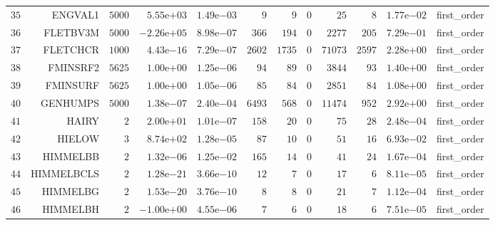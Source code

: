 \begin{longtable}{rrrrrrrrrrrr}
  \(    35\) & ENGVAL1 & \(  5000\) & \( 5.55\)e\(+03\) & \( 1.49\)e\(-03\) & \(     9\) & \(     9\) & \(     0\) & \(    25\) & \(     8\) & \( 1.77\)e\(-02\) & first\_order \\
  \(    36\) & FLETBV3M & \(  5000\) & \(-2.26\)e\(+05\) & \( 8.98\)e\(-07\) & \(   366\) & \(   194\) & \(     0\) & \(  2277\) & \(   205\) & \( 7.29\)e\(-01\) & first\_order \\
  \(    37\) & FLETCHCR & \(  1000\) & \( 4.43\)e\(-16\) & \( 7.29\)e\(-07\) & \(  2602\) & \(  1735\) & \(     0\) & \( 71073\) & \(  2597\) & \( 2.28\)e\(+00\) & first\_order \\
  \(    38\) & FMINSRF2 & \(  5625\) & \( 1.00\)e\(+00\) & \( 1.25\)e\(-06\) & \(    94\) & \(    89\) & \(     0\) & \(  3844\) & \(    93\) & \( 1.40\)e\(+00\) & first\_order \\
  \(    39\) & FMINSURF & \(  5625\) & \( 1.00\)e\(+00\) & \( 1.05\)e\(-06\) & \(    85\) & \(    84\) & \(     0\) & \(  2851\) & \(    84\) & \( 1.08\)e\(+00\) & first\_order \\
  \(    40\) & GENHUMPS & \(  5000\) & \( 1.38\)e\(-07\) & \( 2.40\)e\(-04\) & \(  6493\) & \(   568\) & \(     0\) & \( 11474\) & \(   952\) & \( 2.92\)e\(+00\) & first\_order \\
  \(    41\) & HAIRY & \(     2\) & \( 2.00\)e\(+01\) & \( 1.01\)e\(-07\) & \(   158\) & \(    20\) & \(     0\) & \(    75\) & \(    28\) & \( 2.48\)e\(-04\) & first\_order \\
  \(    42\) & HIELOW & \(     3\) & \( 8.74\)e\(+02\) & \( 1.28\)e\(-05\) & \(    87\) & \(    10\) & \(     0\) & \(    51\) & \(    16\) & \( 6.93\)e\(-02\) & first\_order \\
  \(    43\) & HIMMELBB & \(     2\) & \( 1.32\)e\(-06\) & \( 1.25\)e\(-02\) & \(   165\) & \(    14\) & \(     0\) & \(    41\) & \(    24\) & \( 1.67\)e\(-04\) & first\_order \\
  \(    44\) & HIMMELBCLS & \(     2\) & \( 1.28\)e\(-21\) & \( 3.66\)e\(-10\) & \(    12\) & \(     7\) & \(     0\) & \(    17\) & \(     6\) & \( 8.11\)e\(-05\) & first\_order \\
  \(    45\) & HIMMELBG & \(     2\) & \( 1.53\)e\(-20\) & \( 3.76\)e\(-10\) & \(     8\) & \(     8\) & \(     0\) & \(    21\) & \(     7\) & \( 1.12\)e\(-04\) & first\_order \\
  \(    46\) & HIMMELBH & \(     2\) & \(-1.00\)e\(+00\) & \( 4.55\)e\(-06\) & \(     7\) & \(     6\) & \(     0\) & \(    18\) & \(     6\) & \( 7.51\)e\(-05\) & first\_order \\

\end{longtable}
